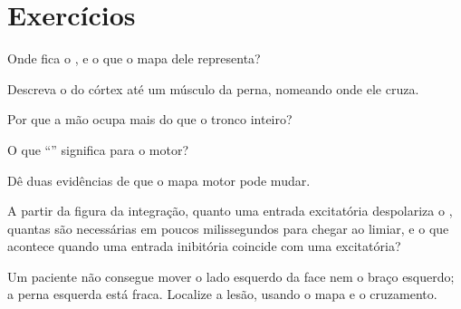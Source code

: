 \section{Exercícios}

\begin{exercise}[$\star$]\label{exo:g12:brain-and-movement:1}
Onde fica o , e o que o mapa dele representa?
\end{exercise}

\begin{exercise}[$\star$]\label{exo:g12:brain-and-movement:2}
Descreva o  do córtex até um músculo da perna,
nomeando onde ele cruza.
\end{exercise}

\begin{exercise}[$\star$]\label{exo:g12:brain-and-movement:3}
Por que a mão ocupa mais do  que o tronco inteiro?
\end{exercise}

\begin{exercise}[$\star$]\label{exo:g12:brain-and-movement:4}
O que ``'' significa para o  motor?
\end{exercise}

\begin{exercise}[$\star$]\label{exo:g12:brain-and-movement:5}
Dê duas evidências de que o mapa motor pode mudar.
\end{exercise}

\begin{exercise}[$\star\star$]\label{exo:g12:brain-and-movement:6}
A partir da figura da integração, quanto uma entrada excitatória
despolariza o , quantas são necessárias em poucos
milissegundos para chegar ao limiar, e o que acontece quando uma
entrada inibitória coincide com uma excitatória?
\end{exercise}

\begin{exercise}[$\star\star$]\label{exo:g12:brain-and-movement:7}
Um paciente não consegue mover o lado esquerdo da face nem o braço
esquerdo; a perna esquerda está fraca. Localize a lesão, usando o mapa
e o cruzamento.
\end{exercise}

